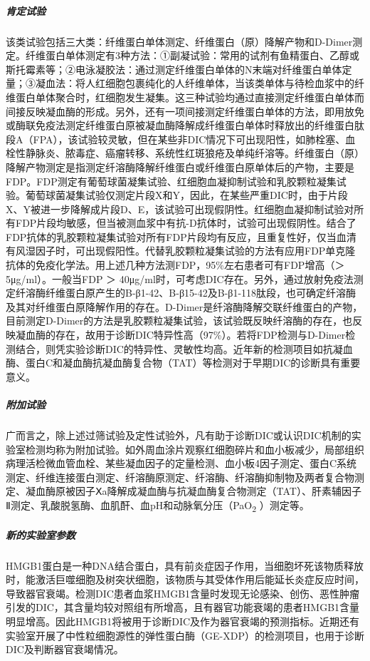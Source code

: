 \subparagraph{肯定试验}

该类试验包括三大类：纤维蛋白单体测定、纤维蛋白（原）降解产物和D-Dimer测定。纤维蛋白单体测定有3种方法：①副凝试验：常用的试剂有鱼精蛋白、乙醇或斯托霉素等；②电泳凝胶法：通过测定纤维蛋白单体的N末端对纤维蛋白单体定量；③凝血法：将人红细胞包裹纯化的人纤维单体，当该类单体与待检血浆中的纤维蛋白单体聚合时，红细胞发生凝集。这三种试验均通过直接测定纤维蛋白单体而间接反映凝血酶的形成。另外，还有一项间接测定纤维蛋白单体的方法，即用放免或酶联免疫法测定纤维蛋白原被凝血酶降解成纤维蛋白单体时释放出的纤维蛋白肽段A（FPA），该试验较灵敏，但在某些非DIC情况下可出现阳性，如肺栓塞、血栓性静脉炎、脓毒症、癌瘤转移、系统性红斑狼疮及单纯纤溶等。纤维蛋白（原）降解产物测定是指测定纤溶酶降解纤维蛋白或纤维蛋白原单体后的产物，主要是FDP。FDP测定有葡萄球菌凝集试验、红细胞血凝抑制试验和乳胶颗粒凝集试验。葡萄球菌凝集试验仅测定片段X和Y，因此，在某些严重DIC时，由于片段X、Y被进一步降解成片段D、E，该试验可出现假阴性。红细胞血凝抑制试验对所有FDP片段均敏感，但当被测血浆中有抗-D抗体时，试验可出现假阴性。结合了FDP抗体的乳胶颗粒凝集试验对所有FDP片段均有反应，且重复性好，仅当血清有风湿因子时，可出现假阳性。代替乳胶颗粒凝集试验的方法有应用FDP单克隆抗体的免疫化学法。用上述几种方法测FDP，95\%左右患者可有FDP增高（＞
5μg/ml）。一般当FDP ＞
40μg/ml时，可考虑DIC存在。另外，通过放射免疫法测定纤溶酶纤维蛋白原产生的B-β1-42、B-β15-42及B-β1-118肽段，也可确定纤溶酶及其对纤维蛋白原降解作用的存在。D-Dimer是纤溶酶降解交联纤维蛋白的产物，目前测定D-Dimer的方法是乳胶颗粒凝集试验，该试验既反映纤溶酶的存在，也反映凝血酶的存在，故用于诊断DIC特异性高（97\%）。若将FDP检测与D-Dimer检测结合，则凭实验诊断DIC的特异性、灵敏性均高。近年新的检测项目如抗凝血酶、蛋白C和凝血酶抗凝血酶复合物（TAT）等检测对于早期DIC的诊断具有重要意义。

\subparagraph{附加试验}

广而言之，除上述过筛试验及定性试验外，凡有助于诊断DIC或认识DIC机制的实验室检测均称为附加试验。如外周血涂片观察红细胞碎片和血小板减少，局部组织病理活检微血管血栓、某些凝血因子的定量检测、血小板4因子测定、蛋白C系统测定、纤维连接蛋白测定、纤溶酶原测定、纤溶酶、纤溶酶抑制物及两者复合物测定、凝血酶原被因子Ⅹa降解成凝血酶与抗凝血酶复合物测定（TAT）、肝素辅因子Ⅱ测定、乳酸脱氢酶、血肌酐、血pH和动脉氧分压（PaO\textsubscript{2}
）测定等。

\subparagraph{新的实验室参数}

HMGB1蛋白是一种DNA结合蛋白，具有前炎症因子作用，当细胞坏死该物质释放时，能激活巨噬细胞及树突状细胞，该物质与其受体作用后能延长炎症反应时间，导致器官衰竭。检测DIC患者血浆HMGB1含量时发现无论感染、创伤、恶性肿瘤引发的DIC，其含量均较对照组有所增高，且有器官功能衰竭的患者HMGB1含量明显增高。因此HMGB1将被用于诊断DIC及作为器官衰竭的预测指标。近期还有实验室开展了中性粒细胞源性的弹性蛋白酶（GE-XDP）的检测项目，也用于诊断DIC及判断器官衰竭情况。

